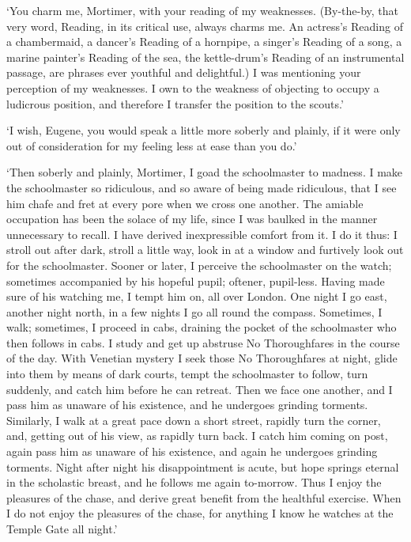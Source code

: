 ‘You charm me, Mortimer, with your reading of my weaknesses. (By-the-by,
that very word, Reading, in its critical use, always charms me. An
actress’s Reading of a chambermaid, a dancer’s Reading of a hornpipe, a
singer’s Reading of a song, a marine painter’s Reading of the sea,
the kettle-drum’s Reading of an instrumental passage, are phrases
ever youthful and delightful.) I was mentioning your perception of my
weaknesses. I own to the weakness of objecting to occupy a ludicrous
position, and therefore I transfer the position to the scouts.’

‘I wish, Eugene, you would speak a little more soberly and plainly, if
it were only out of consideration for my feeling less at ease than you
do.’

‘Then soberly and plainly, Mortimer, I goad the schoolmaster to madness.
I make the schoolmaster so ridiculous, and so aware of being made
ridiculous, that I see him chafe and fret at every pore when we cross
one another. The amiable occupation has been the solace of my life,
since I was baulked in the manner unnecessary to recall. I have derived
inexpressible comfort from it. I do it thus: I stroll out after dark,
stroll a little way, look in at a window and furtively look out for the
schoolmaster. Sooner or later, I perceive the schoolmaster on the watch;
sometimes accompanied by his hopeful pupil; oftener, pupil-less. Having
made sure of his watching me, I tempt him on, all over London. One
night I go east, another night north, in a few nights I go all round the
compass. Sometimes, I walk; sometimes, I proceed in cabs, draining the
pocket of the schoolmaster who then follows in cabs. I study and get
up abstruse No Thoroughfares in the course of the day. With Venetian
mystery I seek those No Thoroughfares at night, glide into them by means
of dark courts, tempt the schoolmaster to follow, turn suddenly, and
catch him before he can retreat. Then we face one another, and I pass
him as unaware of his existence, and he undergoes grinding torments.
Similarly, I walk at a great pace down a short street, rapidly turn the
corner, and, getting out of his view, as rapidly turn back. I catch him
coming on post, again pass him as unaware of his existence, and again
he undergoes grinding torments. Night after night his disappointment is
acute, but hope springs eternal in the scholastic breast, and he follows
me again to-morrow. Thus I enjoy the pleasures of the chase, and derive
great benefit from the healthful exercise. When I do not enjoy the
pleasures of the chase, for anything I know he watches at the Temple
Gate all night.’

